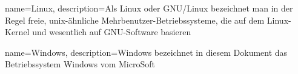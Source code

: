 {
  name={Linux},
  description={Als Linux oder GNU/Linux bezeichnet man in der Regel freie, unix-ähnliche Mehrbenutzer-Betriebssysteme, die auf dem Linux-Kernel und wesentlich auf GNU-Software basieren}
}

{
  name={Windows},
  description={Windows bezeichnet in diesem Dokument das Betriebssystem Windows vom MicroSoft}
}